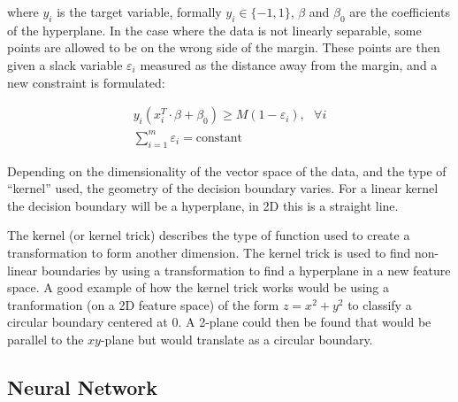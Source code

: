 \documentclass[a4paper,11pt,twoside]{article}
\begin{document}
where $y_i$ is the target variable, formally $y_i \in \{-1, 1\}$, $\beta$ and $\beta_0$ are the coefficients of the hyperplane. In the case where the data is not linearly separable, some points are allowed to be on the wrong side of the margin. These points are then given a slack variable $\varepsilon_i$ measured as the distance away from the margin, and a new constraint is formulated:

\begin{equation}
\begin{gathered}
y_i(x_i^T\cdot\beta+\beta_0)\geq M(1-\varepsilon_i),\text{ } \forall i
\\
\sum_{i=1}^m\varepsilon_i = \text{constant}
\end{gathered}
\end{equation}

Depending on the dimensionality of the vector space of the data, and the type of “kernel” used, the geometry of the decision boundary varies. For a linear kernel the decision boundary will be a hyperplane, in 2D this is a straight line. 
\newline

The kernel (or kernel trick) describes the type of function used to create a transformation to form another dimension. The kernel trick is used to find non-linear boundaries by using a transformation to find a hyperplane in a new feature space. A good example of how the kernel trick works would be using a tranformation (on a 2D feature space) of the form $z=x^2+y^2$ to classify a circular boundary centered at 0. A 2-plane could then be found that would be parallel to the $xy$-plane but would translate as a circular boundary.

\subsection{Neural Network}
\end{document}
